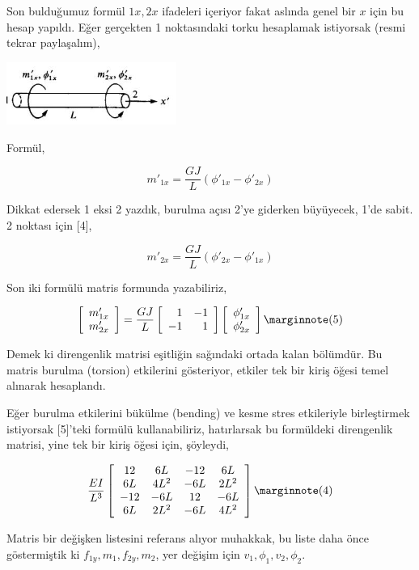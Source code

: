 \documentclass[12pt,fleqn]{article}\usepackage{../../common}
\begin{document}
Son bulduğumuz formül $1x,2x$ ifadeleri içeriyor fakat aslında genel bir
$x$ için bu hesap yapıldı. Eğer gerçekten 1 noktasındaki torku hesaplamak
istiyorsak (resmi tekrar paylaşalım),

\includegraphics[width=15em]{compscieng_bpp43fem_02.jpg}

Formül,

$$
m'_{1x} = \frac{G J}{L} ( \phi'_{1x} - \phi'_{2x}  )
$$

Dikkat edersek 1 eksi 2 yazdık, burulma açısı 2'ye giderken büyüyecek, 1'de
sabit. 2 noktası için [4],

$$
m'_{2x} = \frac{G J}{L} ( \phi'_{2x} - \phi'_{1x}  )
$$

Son iki formülü matris formunda yazabiliriz,

$$
\left[\begin{array}{c}
m'_{1x} \\ m'_{2x} 
\end{array}\right] =
\frac{GJ}{L}
\left[\begin{array}{rr}
1 & -1 \\ -1 & 1
\end{array}\right]
\left[\begin{array}{c}
\phi'_{1x} \\ \phi'_{2x} 
\end{array}\right]
\mlabel{5}
$$

Demek ki direngenlik matrisi eşitliğin sağındaki ortada kalan bölümdür. Bu
matris burulma (torsion) etkilerini gösteriyor, etkiler tek bir kiriş öğesi
temel alınarak hesaplandı.

Eğer burulma etkilerini bükülme (bending) ve kesme stres etkileriyle
birleştirmek istiyorsak [5]'teki formülü kullanabiliriz, hatırlarsak bu
formüldeki direngenlik matrisi, yine tek bir kiriş öğesi için, şöyleydi,

$$
\frac{EI}{L^3}
\left[\begin{array}{cccc}
12 & 6L & -12 & 6L \\
6L & 4L^2 & -6L & 2L^2 \\
-12 & -6L & 12 & -6L \\
6L & 2L^2 & -6L & 4L^2
\end{array}\right]
\mlabel{4}
$$

Matris bir değişken listesini referans alıyor muhakkak, bu liste daha
önce göstermiştik ki $f_{1y}, m_1, f_{2y}, m_2$, yer değişim için
$v_1, \phi_1, v_2, \phi_2$. 
\end{document}
